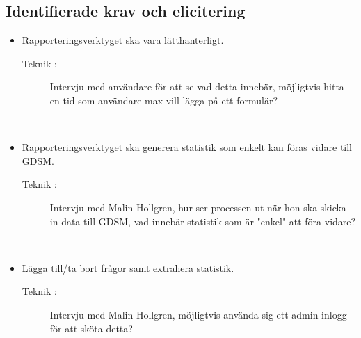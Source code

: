 \documentclass[12pt]{article}
\begin{document}
        \subsection{Identifierade krav och elicitering}
            \begin{itemize}
                \item Rapporteringsverktyget ska vara lätthanterligt.
                    \begin{description}
                        \item[Teknik :]Intervju med användare för att se vad detta innebär, möjligtvis hitta en tid som användare max vill lägga på ett formulär?
                    \end{description}
                    \\
            \item Rapporteringsverktyget ska generera statistik som enkelt kan föras vidare till GDSM.
                    \begin{description}
                        \item[Teknik :]Intervju med Malin Hollgren, hur ser processen ut när hon ska skicka in data till GDSM, vad innebär statistik som är "enkel" att föra vidare?
                    \end{description}
                    \\
             \item Lägga till/ta bort frågor samt extrahera statistik.
                    \begin{description}
                        \item[Teknik :]Intervju med Malin Hollgren, möjligtvis använda sig ett admin inlogg för att sköta detta?
                    \end{description}
                

\end{itemize}
\end{document}
